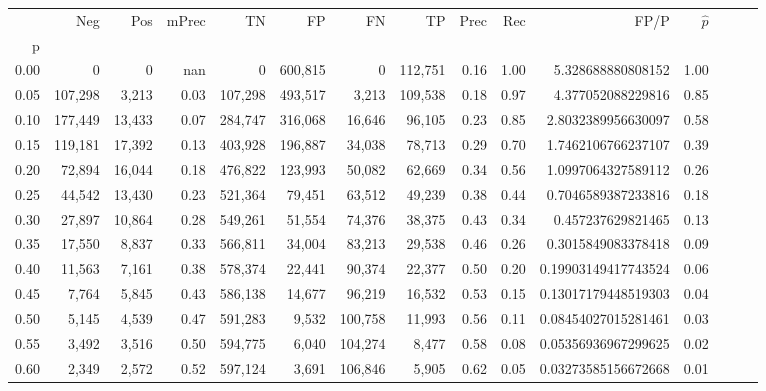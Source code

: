 \begin{tabular}{rrrrrrrrrrrrrrr}
\toprule
{} &      Neg &     Pos & mPrec &       TN &       FP &       FN &       TP &  Prec &   Rec &                   FP/P & $\hat{p}$ \\
p    &          &         &       &          &          &          &          &       &       &                        &           \\
\midrule
0.00 &        0 &       0 &   nan &        0 &  600,815 &        0 &  112,751 &  0.16 &  1.00 &      5.328688880808152 &      1.00 \\
0.05 &  107,298 &   3,213 &  0.03 &  107,298 &  493,517 &    3,213 &  109,538 &  0.18 &  0.97 &      4.377052088229816 &      0.85 \\
0.10 &  177,449 &  13,433 &  0.07 &  284,747 &  316,068 &   16,646 &   96,105 &  0.23 &  0.85 &     2.8032389956630097 &      0.58 \\
0.15 &  119,181 &  17,392 &  0.13 &  403,928 &  196,887 &   34,038 &   78,713 &  0.29 &  0.70 &     1.7462106766237107 &      0.39 \\
0.20 &   72,894 &  16,044 &  0.18 &  476,822 &  123,993 &   50,082 &   62,669 &  0.34 &  0.56 &     1.0997064327589112 &      0.26 \\
0.25 &   44,542 &  13,430 &  0.23 &  521,364 &   79,451 &   63,512 &   49,239 &  0.38 &  0.44 &     0.7046589387233816 &      0.18 \\
0.30 &   27,897 &  10,864 &  0.28 &  549,261 &   51,554 &   74,376 &   38,375 &  0.43 &  0.34 &      0.457237629821465 &      0.13 \\
0.35 &   17,550 &   8,837 &  0.33 &  566,811 &   34,004 &   83,213 &   29,538 &  0.46 &  0.26 &     0.3015849083378418 &      0.09 \\
0.40 &   11,563 &   7,161 &  0.38 &  578,374 &   22,441 &   90,374 &   22,377 &  0.50 &  0.20 &    0.19903149417743524 &      0.06 \\
0.45 &    7,764 &   5,845 &  0.43 &  586,138 &   14,677 &   96,219 &   16,532 &  0.53 &  0.15 &    0.13017179448519303 &      0.04 \\
0.50 &    5,145 &   4,539 &  0.47 &  591,283 &    9,532 &  100,758 &   11,993 &  0.56 &  0.11 &    0.08454027015281461 &      0.03 \\
0.55 &    3,492 &   3,516 &  0.50 &  594,775 &    6,040 &  104,274 &    8,477 &  0.58 &  0.08 &    0.05356936967299625 &      0.02 \\
0.60 &    2,349 &   2,572 &  0.52 &  597,124 &    3,691 &  106,846 &    5,905 &  0.62 &  0.05 &    0.03273585156672668 &      0.01 \\

\end{tabular}
